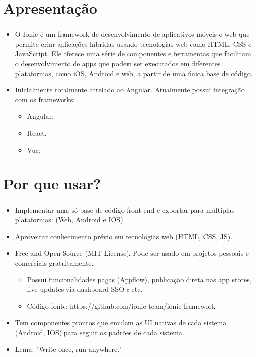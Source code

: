 \documentclass[aspectratio=169]{beamer}
\author{Guilherme B. Spiger, João Pedro Leite e João Pedro Gaspar}
\begin{document}
	
	\frame{
		\titlepage
	}
	
	
	
	\section{Apresentação}
	\begin{frame}[fragile]
		\frametitle{\secname}
		\begin{itemize}
			\item O Ionic é um framework de desenvolvimento de aplicativos móveis e web que permite criar aplicações híbridas usando tecnologias web como HTML, CSS e JavaScript. Ele oferece uma série de componentes e ferramentas que facilitam o desenvolvimento de apps que podem ser executados em diferentes plataformas, como iOS, Android e web, a partir de uma única base de código.
			\item Inicialmente totalmente atrelado ao Angular. Atualmente possui integração com os frameworks:
			\begin{itemize}
				\item Angular.
				\item React.
				\item Vue.
			\end{itemize}
		\end{itemize}
	\end{frame}
	
	\section{Por que usar?}
	\begin{frame}[fragile]
		\frametitle{\secname}
		\begin{itemize}
			\item Implementar uma só base de código front-end e exportar para múltiplas plataformas: (Web, Android e IOS).
			\item Aproveitar conhecimento prévio em tecnologias web (HTML, CSS, JS).
			\item Free and Open Source (MIT License). Pode ser usado em projetos pessoais e comerciais gratuitamente. 
			\begin{itemize}
				\item Possui funcionalidades pagas (Appflow), publicação direta nas app stores, live updates via dashboard SSO e etc. 
				\item Código fonte: https://github.com/ionic-team/ionic-framework
			\end{itemize}
			\item Tem componentes prontos que emulam as UI nativas de cada sistema (Android, IOS) para seguir os padrões de cada sistema.
			\item Lema: "Write once, run anywhere."	
		\end{itemize}
	\end{frame}
	
\end{document}
